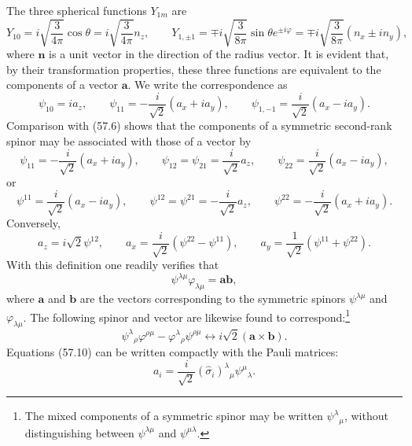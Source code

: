 The three spherical functions $Y_{1m}$ are
\[
 Y_{10}=i\sqrt{\frac3{4\pi}}\cos\theta=i\sqrt{\frac3{4\pi}}n_z,
 \qquad
 Y_{1,\pm1}=\mp i\sqrt{\frac3{8\pi}}\sin\theta e^{\pm i\varphi}
 =\mp i\sqrt{\frac3{8\pi}}(n_x\pm in_y),
\]
where $\mathbf n$ is a unit vector in the direction of the radius vector. It
is evident that, by their transformation properties, these three functions
are equivalent to the components of a vector $\mathbf a$. We write the
correspondence as
\begin{equation}
 \psi_{10}=ia_z,\qquad
 \psi_{11}=-\frac i{\sqrt2}(a_x+ia_y),\qquad
 \psi_{1,-1}=\frac i{\sqrt2}(a_x-ia_y).
 \tag{57.7}
\end{equation}
Comparison with (57.6) shows that the components of a symmetric second-rank
spinor may be associated with those of a vector by
\begin{equation}
 \psi_{11}=-\frac i{\sqrt2}(a_x+ia_y),\qquad
 \psi_{12}=\psi_{21}=\frac i{\sqrt2}a_z,\qquad
 \psi_{22}=\frac i{\sqrt2}(a_x-ia_y),
 \tag{57.8}
\end{equation}
or
\begin{equation}
 \psi^{11}=\frac i{\sqrt2}(a_x-ia_y),\qquad
 \psi^{12}=\psi^{21}=-\frac i{\sqrt2}a_z,\qquad
 \psi^{22}=-\frac i{\sqrt2}(a_x+ia_y).
 \tag{57.9}
\end{equation}
Conversely,
\begin{equation}
 a_z=i\sqrt2\psi^{12},\qquad
 a_x=\frac i{\sqrt2}(\psi^{22}-\psi^{11}),\qquad
 a_y=\frac1{\sqrt2}(\psi^{11}+\psi^{22}).
 \tag{57.10}
\end{equation}
With this definition one readily verifies that
\begin{equation}
 \psi^{\lambda\mu}\varphi_{\lambda\mu}=\mathbf a\mathbf b,
 \tag{57.11}
\end{equation}
where $\mathbf a$ and $\mathbf b$ are the vectors corresponding to the
symmetric spinors $\psi^{\lambda\mu}$ and $\varphi_{\lambda\mu}$. The
following spinor and vector are likewise found to correspond:\footnote{The
mixed components of a symmetric spinor may be written
$\psi^\lambda{}_{\mu}$, without distinguishing between
$\psi^{\lambda\mu}$ and $\psi^{\mu\lambda}$.}
\begin{equation}
 \psi^\lambda{}_{\rho}\varphi^{\rho\mu}
 -\varphi^\lambda{}_{\rho}\psi^{\rho\mu}
 \longleftrightarrow i\sqrt2(\mathbf a\times\mathbf b).
 \tag{57.12}
\end{equation}
Equations (57.10) can be written compactly with the Pauli matrices:
\begin{equation}
 a_i=\frac i{\sqrt2}(\hat\sigma_i)^\lambda{}_{\mu}
 \psi^\mu{}_{\lambda}.
 \tag{57.13}
\end{equation}

